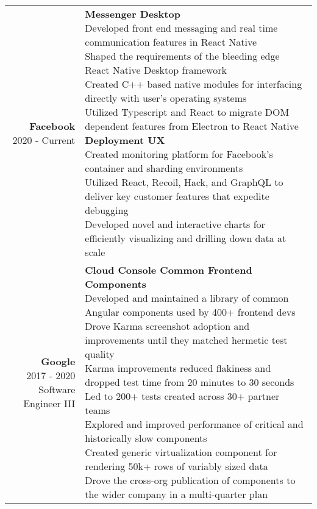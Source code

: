 \documentclass{article}
\makeatletter
\newcommand*\lineBr[2][c]{\begin{tabular}[#1]{@{}r@{}}#2\end{tabular}}
\newcommand*\lineBl[2][c]{\begin{tabular}[#1]{@{}l@{}}#2\end{tabular}}
\makeatother
\begin{document}
\begin{tabularx}{\textwidth}{ r | X }
  \vspace{4mm}
  \lineBr{ {\large {\bf Facebook }\\[2mm]2020 - Current}} &
  \lineBl{
    {\bf Messenger Desktop} \\[2mm]
    Developed front end messaging and real time communication features in React Native \\[2mm]
    Shaped the requirements of the bleeding edge React Native Desktop framework \\[2mm]
    Created C++ based native modules for interfacing directly with user's operating systems \\[2mm]
    Utilized Typescript and React to migrate DOM dependent features from Electron to React Native \\[4mm]
    {\bf Deployment UX} \\[2mm]
    Created monitoring platform for Facebook's container and sharding environments \\[2mm]
    Utilized React, Recoil, Hack, and GraphQL to deliver key customer features that expedite debugging \\[2mm]
    Developed novel and interactive charts for efficiently visualizing and drilling down data at scale
  } \\
  \vspace{4mm}
  \lineBr{ {\large {\bf Google }\\[2mm]2017 - 2020\\[2mm]Software Engineer III}} &
  \lineBl{
    {\bf Cloud Console Common Frontend Components} \\[2mm]
    Developed and maintained a library of common Angular components used by 400+ frontend devs \\[2mm]
    Drove Karma screenshot adoption and improvements until they matched hermetic test quality \\[2mm]
    Karma improvements reduced flakiness and dropped test time from 20 minutes to 30 seconds \\[2mm]
    Led to 200+ tests created across 30+ partner teams \\[2mm]
    Explored and improved performance of critical and historically slow components \\[2mm]
    Created generic virtualization component for rendering 50k+ rows of variably sized data \\[2mm]
    Drove the cross-org publication of components to the wider company in a multi-quarter plan \\[2mm]
}
\end{tabularx}
\end{document}
